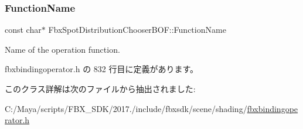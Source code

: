 \subsubsection{\texorpdfstring{Function\+Name}{FunctionName}}
{\footnotesize\ttfamily const char$\ast$ Fbx\+Spot\+Distribution\+Chooser\+B\+O\+F\+::\+Function\+Name\hspace{0.3cm}{\ttfamily [static]}}



Name of the operation function. 



 fbxbindingoperator.\+h の 832 行目に定義があります。



このクラス詳解は次のファイルから抽出されました\+:\begin{DoxyCompactItemize}
\item 
C\+:/\+Maya/scripts/\+F\+B\+X\+\_\+\+S\+D\+K/2017./include/fbxsdk/scene/shading/\hyperlink{fbxbindingoperator_8h}{fbxbindingoperator.\+h}\end{DoxyCompactItemize}
